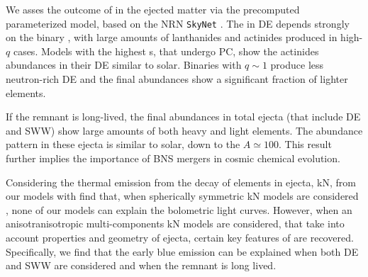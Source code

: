 We asses the outcome of \rproc{} \nuc{} in the ejected matter via the precomputed 
parameterized model, based on the \ac{NRN} \texttt{SkyNet} \citep{Lippuner:2015gwa}.
%
The \rproc{} in \ac{DE} depends strongly on the binary \mr{}, 
with large amounts of lanthanides and actinides produced in high-$q$ cases.
Models with the highest \mr{}s, that undergo \ac{PC}, show the 
actinides abundances in their \ac{DE} similar to solar.
%
Binaries with $q \sim 1$ produce less neutron-rich \ac{DE} and the 
final abundances show a significant fraction of lighter elements. 

If the \pmerg{} remnant is long-lived, the final \rproc{} abundances in 
total ejecta (that include \ac{DE} and \ac{SWW}) show large amounts 
of both heavy and light elements. 
The abundance pattern in these ejecta is similar to solar, down to the $A\simeq 100$.
This result further implies the importance of \ac{BNS} mergers in cosmic 
chemical evolution.

Considering the thermal emission from the decay of \rproc{} elements in ejecta, \ac{kN}, 
from our models with find that, when spherically symmetric \ac{kN} models are 
considered \citep{Villar:2017wcc}, none of our models can explain 
the \AT{} bolometric light curves.
However, when an anisotranisotropic multi-components \ac{kN} models are considered, 
that take into account properties and geometry of ejecta, 
certain key features of \AT{} are recovered.
Specifically, we find that the early blue emission can be explained 
when both \ac{DE} and \ac{SWW} are considered and when the \pmerg{} remnant is long
lived.

